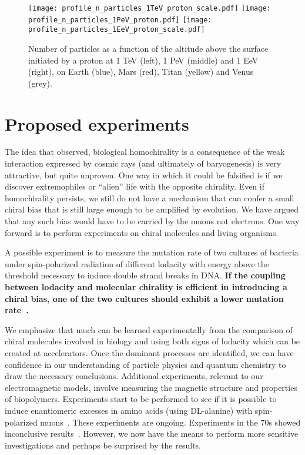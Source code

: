 \documentclass[a4paper,11pt]{article}
\begin{document}
\begin{figure}
\centering
       \texttt{[image: profile\_n\_particles\_1TeV\_proton\_scale.pdf]}
       \texttt{[image: profile\_n\_particles\_1PeV\_proton.pdf]}
    \texttt{[image: profile\_n\_particles\_1EeV\_proton\_scale.pdf]}
\caption{Number of particles as a function of the altitude above the surface initiated by a proton at 1 TeV (left), 1 PeV (middle) and 1 EeV (right), on Earth (blue), Mars (red), Titan (yellow) and Venus (grey).}
\label{fig:founts}
\end{figure}
 
 
 \section{Proposed experiments}
 The idea that observed, biological homochirality is a consequence of the weak interaction expressed by cosmic rays (and ultimately of baryogenesis) is very attractive, but quite unproven. One way in which it could be falsified is if we discover extremophiles or ``alien'' life with the opposite chirality. Even if homochirality persists, we still do not have a mechanism that can confer a small chiral bias that is still large enough to be amplified by evolution. We have argued that any such bias would have to be carried by the muons not electrons. One way forward is to perform experiments on chiral molecules and living organisms. 
 
A possible experiment is to measure the mutation rate of two cultures of bacteria under spin-polarized radiation of different lodacity with energy above the threshold necessary to induce double strand breaks in DNA. {\bf If the coupling between lodacity and molecular chirality is efficient in introducing a chiral bias, one of the two cultures should exhibit a lower mutation rate~\cite{GB20}.} 
 
 We emphasize that much  can be learned experimentally from the comparison of chiral molecules involved in biology and using both signs of lodacity which can be created at accelerators. Once the dominant processes are identified, we can have confidence in our understanding of particle physics and quantum chemistry to draw the necessary conclusions. Additional experiments, relevant to our electromagnetic models, involve measuring the magnetic structure and properties of biopolymers. Experiments start to be performed  to see if it is possible to induce enantiomeric excesses in amino acids (using DL-alanine) with spin-polarized muons~\cite{TK19}. These experiments are ongoing. Experiments in the 70s showed inconclusive results~\cite{Lemmon74,Spencer79}. However, we now have the means to perform more sensitive investigations and perhaps be surprised by the results.
\end{document}
